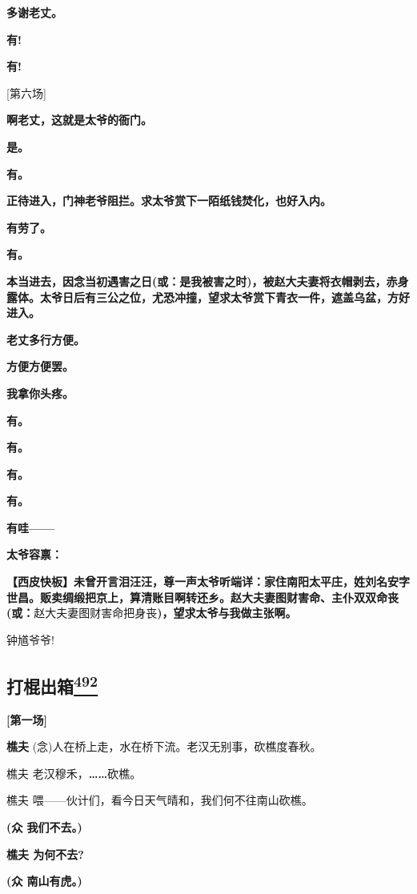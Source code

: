 \textbf{多谢老丈。}

\textbf{有!}

\textbf{有!}

{[}第六场{]}

\textbf{啊老丈，这就是太爷的衙门。}

\textbf{是。}

\textbf{有。}

\textbf{正待进入，门神老爷阻拦。求太爷赏下一陌纸钱焚化，也好入内。}

\textbf{有劳了。}

\textbf{有。}

\textbf{本当进去，因念当初遇害之日(或：是我被害之时)，被赵大夫妻将衣帽剥去，赤身露体。太爷日后有三公之位，尤恐冲撞，望求太爷赏下青衣一件，遮盖乌盆，方好进入。}

\textbf{老丈多行方便。}

\textbf{方便方便罢。}

\textbf{我拿你头疼。}

\textbf{有。}

\textbf{有。}

\textbf{有。}

\textbf{有。}

\textbf{有哇------}

\textbf{太爷容禀：}

\textbf{【西皮快板】未曾开言泪汪汪，尊一声太爷听端详：家住南阳太平庄，姓刘名安字世昌。贩卖绸缎把京上，算清账目啊转还乡。赵大夫妻图财害命、主仆双双命丧(或：}赵大夫妻图财害命把身丧\textbf{)，望求太爷与我做主张啊。}

钟馗爷爷!

\hypertarget{ux6253ux68cdux51faux7bb1}{%
\subsection{\texorpdfstring{打棍出箱\protect\hyperlink{fn492}{\textsuperscript{492}}}{打棍出箱492}}\label{ux6253ux68cdux51faux7bb1}}

\textbf{{[}第一场{]}}

\textbf{樵夫} (念)人在桥上走，水在桥下流。老汉无别事，砍樵度春秋。

樵夫 老汉穆禾，\textbf{\ldots{}\ldots{}}砍樵。

樵夫 喂------伙计们，看今日天气晴和，我们何不往南山砍樵。

\textbf{(众 我们不去。)}

\textbf{樵夫 为何不去?}

\textbf{(众 南山有虎。)}

